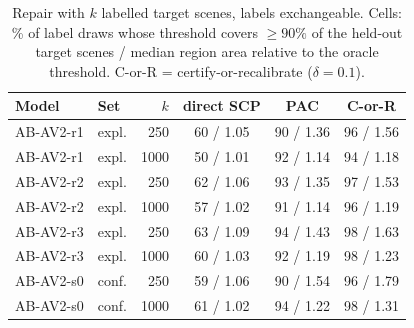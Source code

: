 \begin{table}[t]
\centering
\caption{Repair with $k$ labelled target scenes, labels exchangeable. Cells: \% of label draws whose threshold covers $\ge 90\%$ of the held-out target scenes / median region area relative to the oracle threshold. C-or-R = certify-or-recalibrate ($\delta=0.1$).}
\label{tab:repair}
\begin{tabular}{llrccc}
\toprule
Model & Set & $k$ & direct SCP & PAC & C-or-R \\
\midrule
AB-AV2-r1 & expl. & 250 & 60 / 1.05 & 90 / 1.36 & 96 / 1.56 \\
AB-AV2-r1 & expl. & 1000 & 50 / 1.01 & 92 / 1.14 & 94 / 1.18 \\
AB-AV2-r2 & expl. & 250 & 62 / 1.06 & 93 / 1.35 & 97 / 1.53 \\
AB-AV2-r2 & expl. & 1000 & 57 / 1.02 & 91 / 1.14 & 96 / 1.19 \\
AB-AV2-r3 & expl. & 250 & 63 / 1.09 & 94 / 1.43 & 98 / 1.63 \\
AB-AV2-r3 & expl. & 1000 & 60 / 1.03 & 92 / 1.19 & 98 / 1.23 \\
AB-AV2-s0 & conf. & 250 & 59 / 1.06 & 90 / 1.54 & 96 / 1.79 \\
AB-AV2-s0 & conf. & 1000 & 61 / 1.02 & 94 / 1.22 & 98 / 1.31 \\
\bottomrule
\end{tabular}
\end{table}
